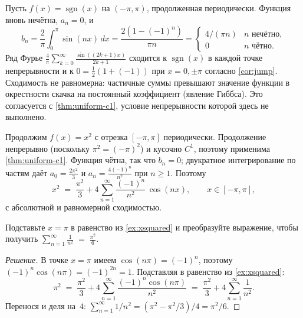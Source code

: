 \begin{example}
\label{ex:square}
Пусть $f(x) = \operatorname{sgn}(x)$ на $(-\pi, \pi)$, продолженная
периодически. Функция вновь нечётна, $a_n = 0$, и
\[
  b_n = \frac{2}{\pi} \int_{0}^{\pi} \sin(nx)\, dx
       = \frac{2 (1 - (-1)^n)}{\pi n}
       = \begin{cases} 4/(\pi n) & n \text{ нечётно},\\ 0 & n \text{ чётно}. \end{cases}
\]
Ряд Фурье
$\frac{4}{\pi} \sum_{k = 0}^{\infty} \frac{\sin((2k+1) x)}{2k+1}$
сходится к $\operatorname{sgn}(x)$ в каждой точке непрерывности и к
$0 = \tfrac12(1 + (-1))$ при $x = 0, \pm\pi$ согласно \cref{cor:jump}.
Сходимость не равномерна: частичные суммы превышают значение функции
в окрестности скачка на постоянный коэффициент (явление Гиббса). Это
согласуется с \cref{thm:uniform-c1}, условие непрерывности которой
здесь не выполнено.
\end{example}

\begin{example}
\label{ex:xsquared}
Продолжим $f(x) = x^2$ с отрезка $[-\pi, \pi]$ периодически.
Продолжение непрерывно (поскольку $\pi^2 = (-\pi)^2$) и кусочно $C^1$,
поэтому применима \cref{thm:uniform-c1}. Функция чётна, так что
$b_n = 0$; двукратное интегрирование по частям даёт
$a_0 = \frac{2\pi^2}{3}$ и $a_n = \frac{4 (-1)^n}{n^2}$ при $n \ge 1$.
Поэтому
\[
  x^2 \;=\; \frac{\pi^2}{3} + 4 \sum_{n=1}^{\infty} \frac{(-1)^n}{n^2}\, \cos(nx),
  \qquad x \in [-\pi, \pi],
\]
с абсолютной и равномерной сходимостью.
\end{example}

\begin{problem}
\label{prob:basel}
Подставьте $x = \pi$ в равенство из \cref{ex:xsquared} и преобразуйте
выражение, чтобы получить
$\displaystyle \sum_{n=1}^{\infty} \frac{1}{n^2} \;=\; \frac{\pi^2}{6}$.
\end{problem}

\begin{proof}[Решение]
В точке $x = \pi$ имеем $\cos(n\pi) = (-1)^n$, поэтому
$(-1)^n \cos(n\pi) = (-1)^{2n} = 1$. Подставляя в равенство из
\cref{ex:xsquared}:
\[
  \pi^2 \;=\; \frac{\pi^2}{3} + 4 \sum_{n=1}^{\infty} \frac{(-1)^n \cos(n\pi)}{n^2}
       \;=\; \frac{\pi^2}{3} + 4 \sum_{n=1}^{\infty} \frac{1}{n^2}.
\]
Перенося и деля на~$4$:
$\sum_{n=1}^{\infty} 1/n^2 = (\pi^2 - \pi^2/3)/4 = \pi^2/6$.
\end{proof}

